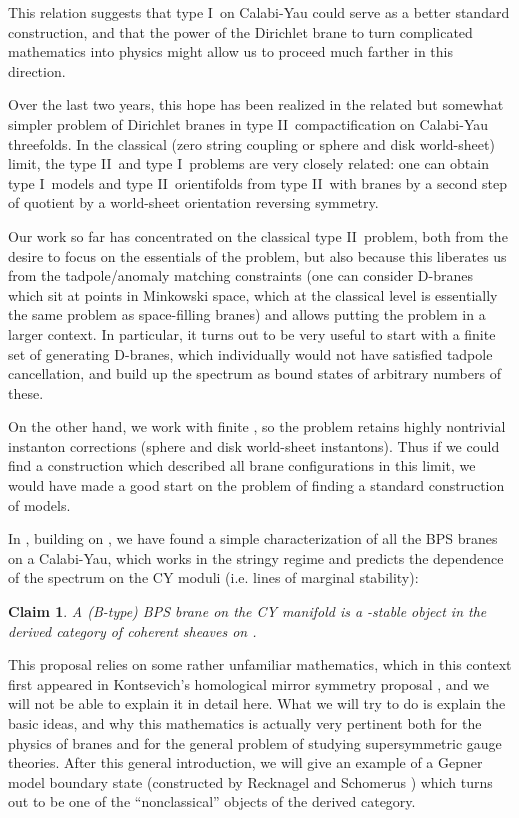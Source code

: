 \documentclass[a4paper,12pt]{amsart}
\numberwithin{equation}{section}
\theoremstyle{plain}
\newtheorem{claim}[theorem]{Claim}
\theoremstyle{definition}
\def\cal{\mathcal}
\def \I {I}
\def \II {II}
\def\CN{{\cal N}}
\begin{document}
This relation suggests that type \I\ on Calabi-Yau could serve as a
better standard construction, and that the power of the Dirichlet brane
to turn complicated mathematics into physics might allow us to proceed
much farther in this direction.

Over the last two years, this hope has been realized in the related
but somewhat simpler problem of Dirichlet branes in type \II\
compactification on Calabi-Yau threefolds.  In the classical (zero
string coupling or sphere and disk world-sheet) limit, the type \II\
and type \I\ problems are very closely related: one can obtain type
\I\ models and type \II\ orientifolds from type \II\ with branes by a
second step of quotient by a world-sheet orientation reversing symmetry.

Our work so far has concentrated on the classical type \II\ problem,
both from the desire to focus on the essentials of the problem, but
also because this liberates us from the tadpole/anomaly matching
constraints (one can consider D-branes which sit at points in
Minkowski space, which at the classical level is essentially the same
problem as space-filling branes) and allows putting the problem in a
larger context.  In particular, it turns out to be very useful to
start with a finite set of generating D-branes, which individually
would not have satisfied tadpole cancellation, and build up the
spectrum as bound states of arbitrary numbers of these.

On the other hand, we work with finite \coordHE{}, so the problem
retains highly nontrivial instanton corrections (sphere and disk
world-sheet instantons).  Thus if we could find a construction which
described all brane configurations in this limit, we would have made a
good start on the problem of finding a standard construction of
\myHighlight{$\CN=1$}\coordHE{} models.

In \cite{DCS}, building on \cite{BDLR,DD,Doug,DFR,DFRtwo}, we have
found a simple characterization of all the BPS branes on a Calabi-Yau,
which works in the stringy regime and predicts the dependence of the
spectrum on the CY moduli (i.e. lines of marginal stability):

\begin{claim}
A (B-type) BPS brane on the CY manifold \coordHE{} is a \myHighlight{$\Pi$}\coordHE{}-stable
object in the derived category of coherent sheaves on \coordHE{}.
\end{claim}

This proposal relies on some rather unfamiliar mathematics, which in
this context first appeared in Kontsevich's homological mirror
symmetry proposal \cite{Kontsevich}, and we will not be able to
explain it in detail here.  What we will try to do is explain the
basic ideas, and why this mathematics is actually very pertinent both
for the physics of branes and for the general problem of studying
\myHighlight{$\CN=1$}\coordHE{} supersymmetric gauge theories.  After this general
introduction, we will give an example of a Gepner model boundary state
(constructed by Recknagel and Schomerus \cite{RS}) which turns out to
be one of the ``nonclassical'' objects of the derived category.
\end{document}
